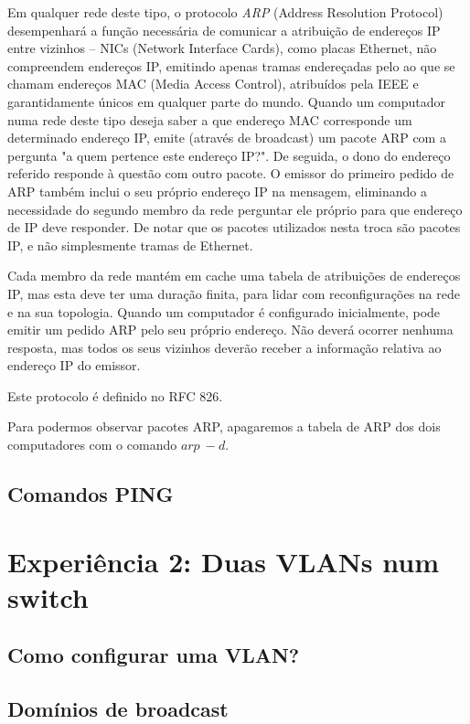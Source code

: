 \documentclass[a4paper,11pt,titlepage]{article}
\begin{document}
Em qualquer rede deste tipo, o protocolo \emph{ARP} (Address Resolution Protocol)
desempenhará a função necessária de comunicar a atribuição de endereços IP
entre vizinhos -- NICs (Network Interface Cards), como placas Ethernet, não
compreendem endereços IP, emitindo apenas tramas endereçadas pelo ao que se
chamam endereços MAC (Media Access Control), atribuídos pela IEEE e
garantidamente únicos em qualquer parte do mundo. Quando um computador numa
rede deste tipo deseja saber a que endereço MAC corresponde um determinado
endereço IP, emite (através de broadcast) um pacote ARP com a pergunta "a quem
pertence este endereço IP?". De seguida, o dono do endereço referido responde à
questão com outro pacote. O emissor do primeiro pedido de ARP também inclui o
seu próprio endereço IP na mensagem, eliminando a necessidade do segundo membro
da rede perguntar ele próprio para que endereço de IP deve responder.
De notar que os pacotes utilizados nesta troca são pacotes IP, e não
simplesmente tramas de Ethernet.

Cada membro da rede mantém em cache uma tabela de atribuições de endereços IP,
mas esta deve ter uma duração finita, para lidar com reconfigurações na rede e
na sua topologia. Quando um computador é configurado inicialmente, pode emitir
um pedido ARP pelo seu próprio endereço. Não deverá ocorrer nenhuma resposta,
mas todos os seus vizinhos deverão receber a informação relativa ao endereço IP
do emissor.

Este protocolo é definido no RFC 826.

Para podermos observar pacotes ARP, apagaremos a tabela de ARP dos dois
computadores com o comando $arp\ -d$.

\subsection{Comandos PING}




\section{Experiência 2: Duas VLANs num switch }

\subsection{Como configurar uma VLAN?}

\subsection{Domínios de broadcast}
\end{document}
